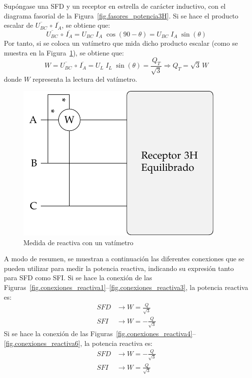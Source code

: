 \documentclass[11pt]{book} %
\numberwithin{dummy}{section}
\theoremstyle{ocrenumbox}
\theoremstyle{blacknumex}
\theoremstyle{blacknumbox}
\theoremstyle{ocrenum}
\begin{document}
Supóngase una SFD y un receptor en estrella de carácter inductivo, con el diagrama fasorial de la Figura~\ref{fig.fasores_potencia3H}. Si se hace el producto escalar de $\overline{U_{BC}}\,\circ\,\overline{I_A}$, se obtiene que:
\begin{equation*}
    \overline{U_{BC}}\,\circ\,\overline{I_A}=U_{BC}\;I_A\;\cos(90-\theta)=U_{BC}\;I_A\;\sin(\theta)
\end{equation*}
Por tanto, si se coloca un vatímetro que mida dicho producto escalar (como se muestra en la Figura~\ref{fig.Reactiva3H_A-BC}), se obtiene que: 
\begin{equation}
    W=\overline{U_{BC}}\,\circ\,\overline{I_A}=U_{L}\;I_L\;\sin(\theta)=\dfrac{Q_T}{\sqrt{3}}\Rightarrow \boxed{Q_T=\sqrt{3}\,W}
\end{equation}
donde $W$ representa la lectura del vatímetro. 
\begin{figure}[htbp]
    \centering
    \includegraphics{../figs/Reactiva3H_A-BC.pdf}
    \caption{Medida de reactiva con un vatímetro}
    \label{fig.Reactiva3H_A-BC}
\end{figure}

A modo de resumen, se muestran a continuación las diferentes conexiones que se pueden utilizar para medir la potencia reactiva, indicando su expresión tanto para SFD como SFI. Si se hace la conexión de las Figuras~\ref{fig.conexiones_reactiva1}--\ref{fig.conexiones_reactiva3}, la potencia reactiva es:
\begin{align}
SFD &\rightarrow \boxed{W = \frac{Q}{\sqrt{3}}}\\
SFI &\rightarrow \boxed{W =  - \frac{Q}{\sqrt{3}}}
\end{align}
Si se hace la conexión de las Figuras~\ref{fig.conexiones_reactiva4}--\ref{fig.conexiones_reactiva6}, la potencia reactiva es:
\begin{align}
SFD &\rightarrow \boxed{W = - \frac{Q}{\sqrt{3}}}\\
SFI &\rightarrow \boxed{W = \frac{Q}{\sqrt{3}}}
\end{align}
\end{document}

